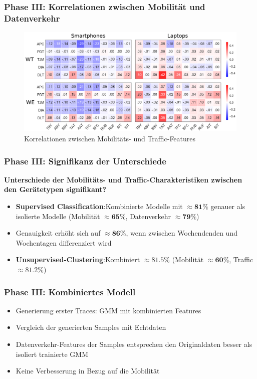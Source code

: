 \documentclass{beamer}
\begin{document}
\begin{frame}
  \frametitle{Phase III: Korrelationen zwischen Mobilität und Datenverkehr}
  \begin{figure}
    \centering
    \includegraphics[width=\textwidth]{images/correlations.png}
    \caption*{Korrelationen zwischen Mobilitäts- und Traffic-Features}
  \end{figure}
\end{frame}

\begin{frame}
  \frametitle{Phase III: Signifikanz der Unterschiede}
  \textbf{Unterschiede der Mobilitäts- und Traffic-Charakteristiken zwischen den Gerätetypen signifikant?}\newline
  \begin{itemize}
    \item \textbf{Supervised Classification}:\newline Kombinierte Modelle mit $\approx \boldsymbol{81\%}$ genauer als isolierte Modelle (Mobilität $\approx \boldsymbol{65 \%}$, Datenverkehr $\approx \boldsymbol{79 \%}$)
    \item Genauigkeit erhöht sich auf $\approx \boldsymbol{86\%}$, wenn zwischen Wochendenden und Wochentagen differenziert wird    
    \item \textbf{Unsupervised-Clustering}:\newline Kombiniert $\approx\boldsymbol{81.5 \%}$ (Mobilität $\approx \boldsymbol{60 \%}$, Traffic $\approx \boldsymbol{81.2 \%}$)
  \end{itemize}
\end{frame}

\begin{frame}
  \frametitle{Phase III: Kombiniertes Modell}
  \begin{itemize}
    \item Generierung erster Traces: GMM mit kombinierten Features
    \item Vergleich der generierten Samples mit Echtdaten
    \item Datenverkehr-Features der Samples entsprechen den Originaldaten besser als isoliert trainierte GMM
    \item Keine Verbesserung in Bezug auf die Mobilität
  \end{itemize}
\end{frame}
\end{document}
